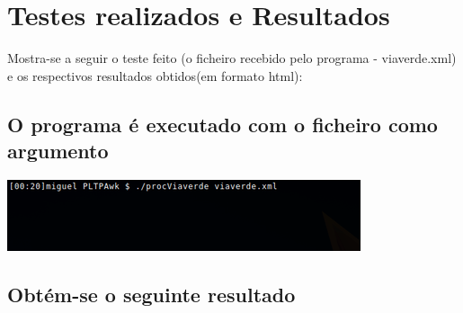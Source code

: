 \documentclass{report}
\begin{document}
\section{Testes realizados e Resultados}
Mostra-se a seguir o teste feito (o ficheiro recebido pelo programa - 
viaverde.xml) e os respectivos resultados obtidos(em formato html):

\subsection{O programa é executado com o ficheiro como argumento}

\includegraphics{in.png}

\subsection{Obtém-se o seguinte resultado}
\end{document}
